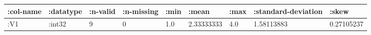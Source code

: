 \documentclass[]{article}
\begin{document}
\begin{longtable}[]{@{}lllllllll@{}}
\toprule
\begin{minipage}[b]{0.08\columnwidth}\raggedright
:col-name\strut
\end{minipage} & \begin{minipage}[b]{0.08\columnwidth}\raggedright
:datatype\strut
\end{minipage} & \begin{minipage}[b]{0.08\columnwidth}\raggedright
:n-valid\strut
\end{minipage} & \begin{minipage}[b]{0.09\columnwidth}\raggedright
:n-missing\strut
\end{minipage} & \begin{minipage}[b]{0.05\columnwidth}\raggedright
:min\strut
\end{minipage} & \begin{minipage}[b]{0.09\columnwidth}\raggedright
:mean\strut
\end{minipage} & \begin{minipage}[b]{0.05\columnwidth}\raggedright
:max\strut
\end{minipage} & \begin{minipage}[b]{0.16\columnwidth}\raggedright
:standard-deviation\strut
\end{minipage} & \begin{minipage}[b]{0.09\columnwidth}\raggedright
:skew\strut
\end{minipage}\tabularnewline
\midrule
\endhead
\begin{minipage}[t]{0.08\columnwidth}\raggedright
:V1\strut
\end{minipage} & \begin{minipage}[t]{0.08\columnwidth}\raggedright
:int32\strut
\end{minipage} & \begin{minipage}[t]{0.08\columnwidth}\raggedright
9\strut
\end{minipage} & \begin{minipage}[t]{0.09\columnwidth}\raggedright
0\strut
\end{minipage} & \begin{minipage}[t]{0.05\columnwidth}\raggedright
1.0\strut
\end{minipage} & \begin{minipage}[t]{0.09\columnwidth}\raggedright
2.33333333\strut
\end{minipage} & \begin{minipage}[t]{0.05\columnwidth}\raggedright
4.0\strut
\end{minipage} & \begin{minipage}[t]{0.16\columnwidth}\raggedright
1.58113883\strut
\end{minipage} & \begin{minipage}[t]{0.09\columnwidth}\raggedright
0.27105237\strut
\end{minipage}\tabularnewline
\bottomrule
\end{longtable}
\end{document}

